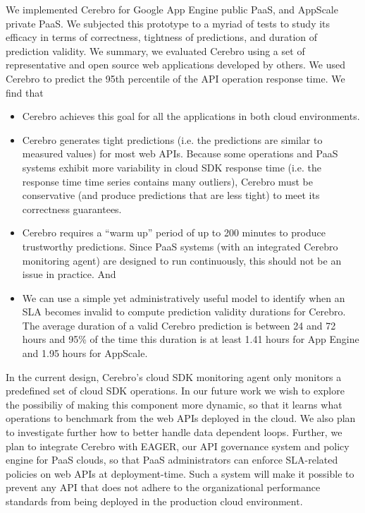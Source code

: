 We implemented Cerebro for Google App Engine public PaaS, 
and AppScale private PaaS. We subjected this
prototype to a myriad of tests to study its efficacy in terms of
correctness, tightness of predictions, and duration of prediction 
validity.  We summary, we evaluated Cerebro using a set of representative
and open source web applications developed by others.  We used Cerebro to
predict the 95th percentile of the API operation response time. 
We find that
\begin{itemize}
\vspace{-0.05in}
\item Cerebro achieves this goal for all the applications in both cloud environments.
\vspace{-0.05in}
\item Cerebro generates tight predictions (i.e.
the predictions are similar to measured values) for most web APIs.  Because
some operations and PaaS systems exhibit more variability in cloud SDK response
time (i.e. the response time time series contains many outliers), 
Cerebro must be conservative (and produce predictions that are less tight)
to meet its correctness guarantees.  
\vspace{-0.05in}
\item Cerebro requires a ``warm up'' period of up to 200 minutes to produce trustworthy predictions. Since PaaS systems (with an integrated Cerebro monitoring agent) are designed to run continuously, this should not be an issue in practice. And
\vspace{-0.05in}
\item We can use a simple yet administratively useful model to identify when an 
SLA becomes invalid to compute
prediction validity durations for Cerebro.  The average duration of a valid
Cerebro prediction is between 24 and 72 hours
and 95\% of the time this duration is at least 
1.41 hours for App Engine and 1.95 hours for AppScale.
\vspace{-0.05in}
\end{itemize}

In the current design, Cerebro's cloud SDK monitoring agent only monitors 
a predefined set of cloud SDK operations. In our future work we wish 
to explore the possibiliy of making this component more dynamic,
so that it learns what operations to benchmark from the web APIs 
deployed in the cloud. We also plan to investigate further how to better
handle data dependent loops. Further, we plan
to integrate Cerebro with EAGER, our API governance system 
and policy engine for PaaS clouds, so 
that PaaS administrators can enforce SLA-related policies on web APIs at deployment-time.
Such a system will make it possible to prevent any API that 
does not adhere to the organizational performance
standards from being deployed in the production cloud environment.
